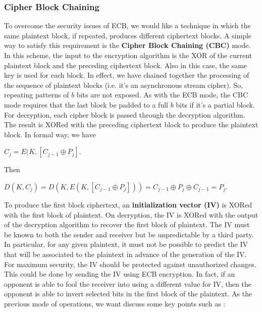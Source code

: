 \documentclass[11pt]{article}
\begin{document}
\subsubsection{Cipher Block Chaining}
To overcome the security issues of ECB, we would like a technique in which the same plaintext block, if repeated, produces different ciphertext blocks. A simple way to satisfy this requirement is the \textbf{Cipher Block Chaining (CBC)} mode. In this scheme, the input to the encryption algorithm is the XOR of the current plaintext block and the preceding ciphertext block. Also in this case, the same key is used for each block. In effect, we have chained together the processing of the sequence of plaintext blocks (i.e. it's an asynchronous stream cipher). So, repeating patterns of $b$ bits are not exposed. As with the ECB mode, the CBC mode requires that the last block be padded to a full $b$ bits if it's a partial block. For decryption, each cipher block is passed through the decryption algorithm. The result is XORed with the preceding ciphertext block to produce the plaintext block. In formal way, we have
\begin{center}
$C_j = E(K, [C_{j - 1} \oplus P_j]$.
\end{center}
Then
\begin{center}
$D(K, C_j) = D(K, E(K, [C_{j - 1} \oplus P_j])) = C_{j - 1} \oplus P_j \oplus C_{j - 1} = P_j$.
\end{center}
To produce the first block ciphertext, an \textbf{initialization vector (IV)} is XORed with the first block of plaintext. On decryption, the IV is XORed with the output of the decryption algorithm to recover the first block of plaintext. The IV must be known to both the sender and receiver but be unpredictable by a third party. In particular, for any given plaintext, it must not be possible to predict the IV that will be associated to the plaintext in advance of the generation of the IV. For maximum security, the IV should be protected against unauthorized changes. This could be done by sending the IV using ECB encryption. In fact, if an opponent is able to fool the receiver into using a different value for IV, then the opponent is able to invert selected bits in the first block of the plaintext. As the previous mode of operations, we want discuss some key points such as :
\end{document}
